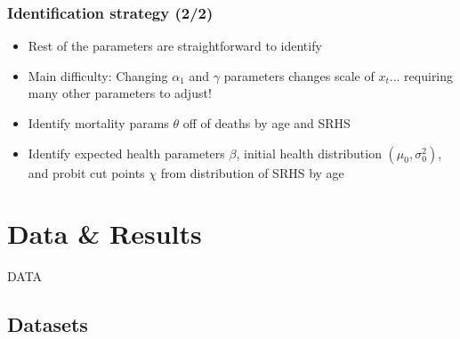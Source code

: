\documentclass[aspectratio=169]{beamer}
\begin{document}
\begin{frame}\frametitle{Identification strategy (2/2)}
\begin{itemize}
	\item <1->Rest of the parameters are straightforward to identify
	
	\item <1->Main difficulty: Changing $\alpha_1$ and $\gamma$ parameters changes scale of $x_t$... requiring many other parameters to adjust!
	
	\item <2->Identify mortality params $\theta$ off of deaths by age and SRHS
	
	\item <3->Identify expected health parameters $\beta$, initial health distribution $(\mu_0, \sigma_0^2)$, and probit cut points $\chi$ from distribution of SRHS by age
\end{itemize}
\end{frame}


\section{Data \& Results}


\begin{frame}
\begin{center}
	\Huge
	DATA
\end{center}
\end{frame}


\subsection{Datasets}
\end{document}
